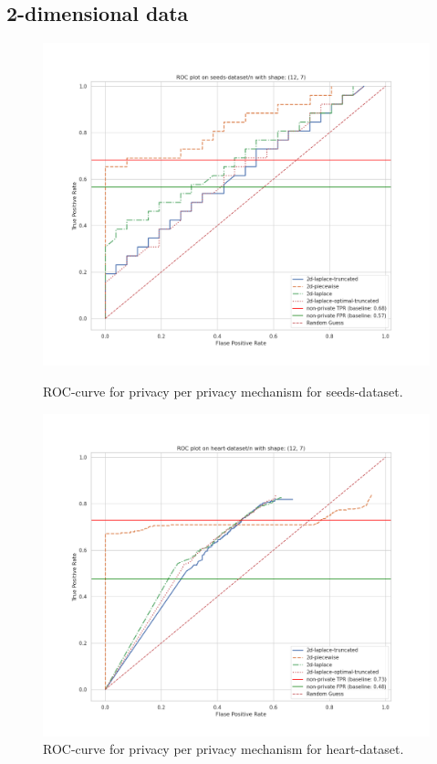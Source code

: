 \subsection{2-dimensional data}
\begin{figure}[H]
    \centering
    \begin{minipage}[c]{0.49\textwidth}
        \includegraphics[width=1\textwidth]{Results/RQ1/seeds-dataset/roc_plot.png}
        \caption{ROC-curve for privacy per privacy mechanism for seeds-dataset.}
        \label{fig:privacy_seeds-dataset_comparison_2d_roc_plot}
    \end{minipage}
    \begin{minipage}[c]{0.49\textwidth}
        \includegraphics[width=1\textwidth]{Results/RQ1/heart-dataset/roc_plot.png}
        \caption{ROC-curve for privacy per privacy mechanism for heart-dataset.}
        \label{fig:privacy_heart-dataset_comparison_2d_roc_plot}
    \end{minipage}
\end{figure}

